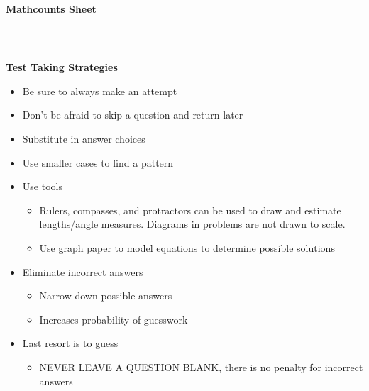 \documentclass[11pt,letterpaper]{article}
\begin{document}
\begin{minipage}{\textwidth}
     \begin{center}
          \textbf{\huge Mathcounts Sheet}
          \vspace{0.1in}
     \end{center}
\end{minipage} \\
\rule[2ex]{\textwidth}{2pt} 
\centering
\begin{minipage}{\textwidth}
     \noindent \textbf{Test Taking Strategies}
     \begin{itemize}
          \item Be sure to always make an attempt
          \item Don't be afraid to skip a question and return later
          \item Substitute in answer choices
          \item Use smaller cases to find a pattern
          \item Use tools
          \begin{itemize}
               \item Rulers, compasses, and protractors can be used to draw and estimate lengths/angle measures. Diagrams in problems are not drawn to scale.
               \item Use graph paper to model equations to determine possible solutions
          \end{itemize}
          \item Eliminate incorrect answers
          \begin{itemize}
               \item Narrow down possible answers
               \item Increases probability of guesswork
          \end{itemize}
          \item Last resort is to guess
          \begin{itemize}
               \item NEVER LEAVE A QUESTION BLANK, there is no penalty for incorrect answers
          \end{itemize}
     \end{itemize}

\end{minipage}


\vspace{0.4cm}
\end{document}
